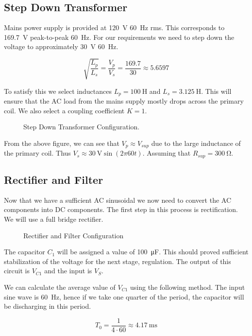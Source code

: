 \documentclass[journal]{IEEEtran}
\begin{document}
\subsection{Step Down Transformer}
Mains power supply is provided at \SI{120}{\volt} \SI{60}{\hertz} rms. This corresponds to \SI{169.7}{\volt} peak-to-peak \SI{60}{\hertz}. For our requirements we need to step down the voltage to approximately \SI{30}{\volt} \SI{60}{\hertz}.

$$ \sqrt{ \frac{L_p}{L_s}}  = \frac{V_p}{V_s} = \frac{169.7}{30} \approx 5.6597 $$

To satisfy this we select inductances $L_p = \SI{100}{\henry}$ and $L_s = \SI{3.125}{\henry}$. This will ensure that the AC load from the mains supply mostly drops across the primary coil. We also select a coupling coefficient $K = 1$.

\begin{figure}[H]
	\centering
	
	\caption{Step Down Transformer Configuration.}
	\label{t1}
\end{figure}

From the above figure, we can see that $V_p \approx V_{sup}$ due to the large inductance of the primary coil. Thus $V_s \approx \SI{30}{\volt} \sin(2\pi 60t)$. Assuming that $R_{sup} = \SI{300}{\ohm}$.

\subsection{Rectifier and Filter}
Now that we have a sufficient AC sinusoidal we now need to convert the AC components into DC components. The first step in this process is rectification. We will use a full bridge rectifier.

\begin{figure}[H]
	\centering
	
	\caption{Rectifier and Filter Configuration}
	\label{rf1}
\end{figure}

The capacitor $C_1$ will be assigned a value of \SI{100}{\micro\farad}. This should proved sufficient stabilization of the voltage for the next stage, regulation. The output of this circuit is $V_{C1}$ and the input is $V_S$.

We can calculate the average value of $V_{C1}$ using the following method. The input sine wave is \SI{60}{\hertz}, hence if we take one quarter of the period, the capacitor will be discharging in this period.

$$ T_0 = \frac{1}{4 \cdot 60} \approx \SI{4.17}{\milli\second} $$
\end{document}
